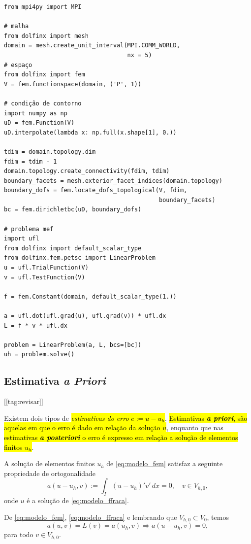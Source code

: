 \begin{ex}
\begin{lstlisting}[caption=ex\_mef1d\_modelo.py]
from mpi4py import MPI

# malha
from dolfinx import mesh
domain = mesh.create_unit_interval(MPI.COMM_WORLD,
                                   nx = 5)
# espaço
from dolfinx import fem
V = fem.functionspace(domain, ('P', 1))

# condição de contorno
import numpy as np
uD = fem.Function(V)
uD.interpolate(lambda x: np.full(x.shape[1], 0.))

tdim = domain.topology.dim
fdim = tdim - 1
domain.topology.create_connectivity(fdim, tdim)
boundary_facets = mesh.exterior_facet_indices(domain.topology)
boundary_dofs = fem.locate_dofs_topological(V, fdim,
                                            boundary_facets)
bc = fem.dirichletbc(uD, boundary_dofs)

# problema mef
import ufl
from dolfinx import default_scalar_type
from dolfinx.fem.petsc import LinearProblem
u = ufl.TrialFunction(V)
v = ufl.TestFunction(V)

f = fem.Constant(domain, default_scalar_type(1.))

a = ufl.dot(ufl.grad(u), ufl.grad(v)) * ufl.dx
L = f * v * ufl.dx

problem = LinearProblem(a, L, bcs=[bc])
uh = problem.solve()
\end{lstlisting}
\end{ex}

\subsection{Estimativa \textit{a Priori}}
[[tag:revisar]]

Existem dois tipos de \hl{\emph{estimativas do erro} $e := u - u_h$}. \hl{Estimativas \textbf{\textit{a priori}}, são aquelas em que o erro é dado em relação da solução $u$}, enquanto que nas \hl{estimativas \textbf{\textit{a posteriori}} o erro é expresso em relação a solução de elementos finitos $u_h$}.

\begin{teo}\label{teo:ortogonalidade_de_Galerkin}
  A solução de elementos finitos $u_h$ de \eqref{eq:modelo_fem} satisfaz a seguinte propriedade de ortogonalidade
  \begin{equation}
    a(u-u_h,v) := \int_I (u-u_h)'v'\,dx = 0,\quad v\in V_{h,0},
  \end{equation}
onde $u$ é a solução de \eqref{eq:modelo_ffraca}.
\end{teo}
\begin{dem}
  De \eqref{eq:modelo_fem}, \eqref{eq:modelo_ffraca} e lembrando que $V_{h,0}\subset V_0$, temos
  \begin{equation}
    a(u,v) = L(v) = a(u_h,v) \Rightarrow a(u-u_h, v) = 0,
  \end{equation}
para todo $v\in V_{h,0}$.
\end{dem}

